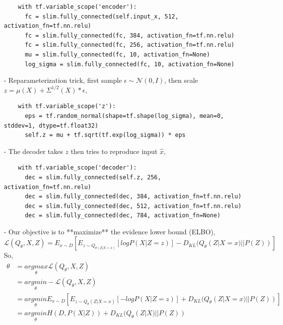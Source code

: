 \documentclass[graybox]{svmult}
\begin{document}
\begin{verbatim}
    with tf.variable_scope('encoder'):
      fc = slim.fully_connected(self.input_x, 512, activation_fn=tf.nn.relu)
      fc = slim.fully_connected(fc, 384, activation_fn=tf.nn.relu)
      fc = slim.fully_connected(fc, 256, activation_fn=tf.nn.relu)
      mu = slim.fully_connected(fc, 10, activation_fn=None)
      log_sigma = slim.fully_connected(fc, 10, activation_fn=None)
\end{verbatim}

- Reparameterization trick, first sample $\epsilon \sim \mathcal{N}(0, I)$, then scale $z = \mu(X) + \Sigma^{1/2}(X) * \epsilon$,

\begin{verbatim}
    with tf.variable_scope('z'):
      eps = tf.random_normal(shape=tf.shape(log_sigma), mean=0, stddev=1, dtype=tf.float32)
      self.z = mu + tf.sqrt(tf.exp(log_sigma)) * eps
\end{verbatim}

- The decoder takes $z$ then tries to reproduce input $\hat{x}$,

\begin{verbatim}
    with tf.variable_scope('decoder'):
      dec = slim.fully_connected(self.z, 256, activation_fn=tf.nn.relu)
      dec = slim.fully_connected(dec, 384, activation_fn=tf.nn.relu)
      dec = slim.fully_connected(dec, 512, activation_fn=tf.nn.relu)
      dec = slim.fully_connected(dec, 784, activation_fn=None)
\end{verbatim}

- Our objective is to **maximize** the evidence lower bound (ELBO),
\[ \mathcal{L}(Q_{\theta}, X, Z) = E_{x \sim D}[E_{z\sim Q_{\theta(Z|X=x)}}[logP(X|Z=z)] - D_{KL}(Q_{\theta}(Z|X=x) || P(Z))] \]
So,
\[
\begin{aligned}
\theta & = \underset{\theta}{argmax} \mathcal{L}(Q_{\theta}, X, Z) \\
 & = \underset{\theta}{argmin} - \mathcal{L}(Q_{\theta}, X, Z) \\
 & = \underset{\theta}{argmin} E_{x\sim D}[E_{z\sim Q_{\theta}(Z|X=x)}[-logP(X|Z=z)] + D_{KL}(Q_{\theta}(Z|X=x)||P(Z))] \\
 & = \underset{\theta}{argmin} H(D, P(X|Z)) + D_{KL}(Q_{\theta}(Z|X)||P(Z))
\end{aligned}
\]
\end{document}
